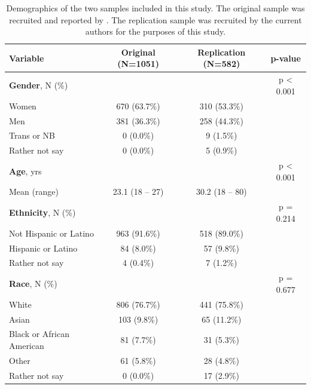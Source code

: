 \documentclass[letterpaper,man,natbib,noextraspace,floatsintext,longtable]{apa6}
\begin{document}
\begin{table}[t!]
    \centering
    \begin{tabular*}{\textwidth}{lccc}
    \toprule
    Variable & Original (N=1051) & Replication (N=582) & p-value \\
    \midrule
    \textbf{Gender}, N (\%)                & & & p < 0.001 \\
    \hspace{1em} Women                     & 670 (63.7\%) & 310 (53.3\%) & \\
    \hspace{1em} Men                       & 381 (36.3\%) & 258 (44.3\%) & \\
    \hspace{1em} Trans or NB               &   0  (0.0\%) &   9  (1.5\%) & \\
    \hspace{1em} Rather not say            &   0  (0.0\%) &   5  (0.9\%) & \\
    \midrule
    \textbf{Age}, yrs                      & & & p < 0.001 \\
    \hspace{1em} Mean (range)              & 23.1 (18 -- 27) & 30.2 (18 -- 80) & \\
    \midrule
    \textbf{Ethnicity}, N (\%)             & & & p = 0.214 \\
    \hspace{1em} Not Hispanic or Latino    & 963 (91.6\%) & 518 (89.0\%) & \\
    \hspace{1em} Hispanic or Latino        &  84  (8.0\%) &  57  (9.8\%) & \\
    \hspace{1em} Rather not say            &   4  (0.4\%) &   7  (1.2\%) & \\
    \midrule
    \textbf{Race}, N (\%)                  & & & p = 0.677 \\
    \hspace{1em} White                     & 806 (76.7\%) & 441 (75.8\%) & \\ 
    \hspace{1em} Asian                     & 103  (9.8\%) &  65 (11.2\%) & \\
    \hspace{1em} Black or African American &  81  (7.7\%) &  31  (5.3\%) & \\
    \hspace{1em} Other                     &  61  (5.8\%) &  28  (4.8\%) & \\
    \hspace{1em} Rather not say            &   0  (0.0\%) &  17  (2.9\%) & \\
    \bottomrule
    \end{tabular*}
    \caption{\normalfont Demographics of the two samples included in this study. The original sample was recruited and reported by \cite{teicher2015maltreatment}. The replication sample was recruited by the current authors for the purposes of this study.}
    \label{tab:demographics}
\end{table}
\end{document}
